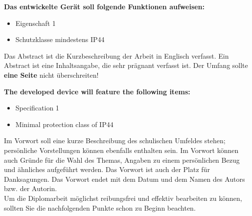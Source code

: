 \textbf{Das entwickelte Gerät soll folgende Funktionen aufweisen:}
\begin{itemize}
	\item Eigenschaft 1
	\item Schutzklasse mindestens IP44
\end{itemize}
\newpage

%
%
\thispagestyle{ErsteSeite}
Das Abstract ist die Kurzbeschreibung der Arbeit  in Englisch verfasst. Ein Abstract ist eine Inhaltsangabe, die sehr prägnant verfasst ist. Der Umfang sollte \textbf{eine Seite} nicht überschreiten!
\vspace{3.0cm}

\textbf{The developed device will feature the following items:}
\begin{itemize}
	\item Specification 1 
	\item Minimal protection class of IP44
\end{itemize}
\newpage

%
%
\thispagestyle{ErsteSeite}
Im Vorwort soll eine kurze Beschreibung des schulischen Umfeldes stehen; per\-sön\-liche Vorstellungen können ebenfalls enthalten sein. Im Vorwort können auch Gründe für die Wahl des Themas, Angaben zu einem persönlichen Bezug und ähnliches aufgeführt werden. Das Vorwort ist auch der Platz für Danksagungen.
Das Vorwort endet mit dem Datum und dem Namen des Autors bzw. der Autorin.\\
Um die Diplomarbeit möglichst reibungsfrei und effektiv bearbeiten zu können, sollten Sie die nachfolgenden Punkte schon zu Beginn beachten.
\vspace{2.0cm}


